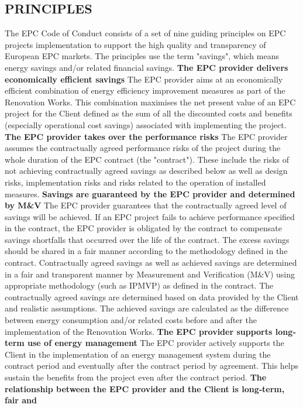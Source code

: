 \begin{multicols}{2}
\subsection{PRINCIPLES}
The EPC Code of Conduct consists of a set of nine guiding principles on EPC
projects implementation to support the high quality and transparency of
European EPC markets.
The principles use the term "savings", which means energy savings and/or
related financial savings.
\textbf{The EPC provider delivers economically efficient savings}
The EPC provider aims at an economically efficient combination of energy
efficiency improvement measures as part of the Renovation Works. This
combination maximises the net present value of an EPC project for the Client
defined as the sum of all the discounted costs and benefits (especially
operational cost savings) associated with implementing the project.
\textbf{The EPC provider takes over the performance risks}
The EPC provider assumes the contractually agreed performance risks of the
project during the whole duration of the EPC contract (the "contract"). These
include the risks of not achieving contractually agreed savings as described
below as well as design risks, implementation risks and risks related to the
operation of installed measures. 
\textbf{Savings are guaranteed by the EPC provider and determined by M\&V} 
The EPC provider guarantees that the contractually agreed level of savings will
be achieved. If an EPC project fails to achieve performance specified in the
contract, the EPC provider is obligated by the contract to compensate savings
shortfalls that occurred over the life of the contract. The excess savings
should be shared in a fair manner according to the methodology defined in the
contract. 
Contractually agreed savings as well as achieved savings are determined in a
fair and transparent manner by Measurement and Verification (M\&V) using
appropriate methodology (such as IPMVP) as defined in the contract. The
contractually agreed savings are determined based on data provided by the
Client and realistic assumptions. The achieved savings are calculated as the
difference between energy consumption and/or related costs before and after the
implementation of the Renovation Works.
\textbf{The EPC provider supports long{‐}term use of energy management} 
The EPC provider actively supports the Client in the implementation of an
energy management system during the contract period and eventually after the
contract period by agreement. This helps sustain the benefits from the project
even after the contract period. 
\textbf{The relationship between the EPC provider and the Client is long{‐}term, fair and
}
\end{multicols}

